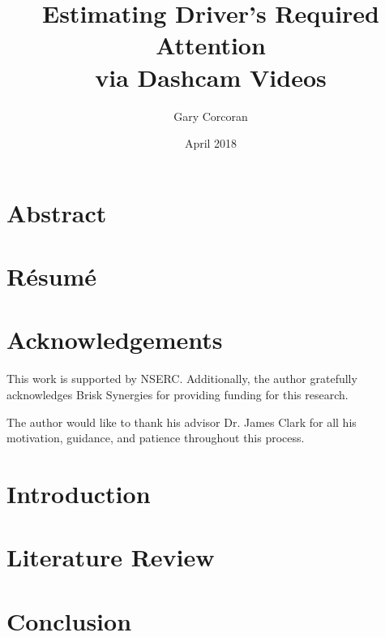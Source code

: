\documentclass[12pt]{report}
\title{Estimating Driver's Required Attention\\
via Dashcam Videos}
\author{Gary Corcoran}
\date{April 2018}
\begin{document}
  

  \chapter*{Abstract}
  

  \chapter*{R\'esum\'e}
  
  
  \chapter*{Acknowledgements}
  This work is supported by NSERC. Additionally, the author gratefully acknowledges Brisk Synergies for providing funding for this research.

  The author would like to thank his advisor Dr. James Clark for all his motivation, guidance, and patience throughout this process.

  \tableofcontents
  \listoffigures
  \listoftables

  \chapter{Introduction}
  

  \chapter{Literature Review}
  

%  
%
%  
%
  \chapter{Conclusion}
  
%
%  

  \printbibliography
\end{document}

